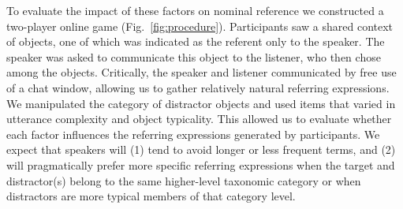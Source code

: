 \documentclass[10pt,letterpaper]{article}
\newcommand{\figref}[1]{Fig.~\ref{#1}}
\begin{document}




To evaluate the impact of these factors on nominal reference we constructed a two-player online game (\figref{fig:procedure}). Participants saw a shared context of objects, one of which was indicated as the referent only to the speaker. The speaker was asked to communicate this object to the listener, who then chose among the objects. Critically, the speaker and listener communicated by free use of a chat window, allowing us to gather relatively natural referring expressions. We manipulated the category of distractor objects and used items that varied in utterance complexity and object typicality. This allowed us to evaluate whether each factor influences the referring expressions generated by participants. We expect that speakers will (1) tend to avoid longer or less frequent terms, and (2) will pragmatically prefer more specific referring expressions when the target and distractor(s) belong to the same higher-level taxonomic category or when distractors are more typical members of that category level.
\end{document}
